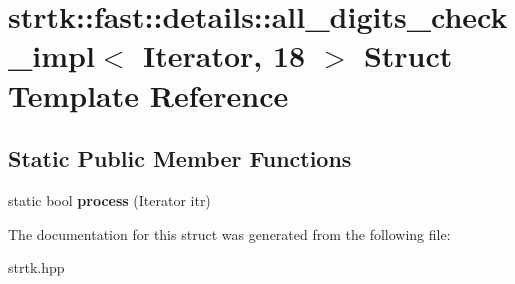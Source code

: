 \hypertarget{structstrtk_1_1fast_1_1details_1_1all__digits__check__impl_3_01Iterator_00_0118_01_4}{\section{strtk\-:\-:fast\-:\-:details\-:\-:all\-\_\-digits\-\_\-check\-\_\-impl$<$ Iterator, 18 $>$ Struct Template Reference}
\label{structstrtk_1_1fast_1_1details_1_1all__digits__check__impl_3_01Iterator_00_0118_01_4}
}
\subsection*{Static Public Member Functions}
\begin{DoxyCompactItemize}
\item 
\hypertarget{structstrtk_1_1fast_1_1details_1_1all__digits__check__impl_3_01Iterator_00_0118_01_4_aeb7812faea601b05ef7bfc5637e872d1}{static bool {\bfseries process} (Iterator itr)}\label{structstrtk_1_1fast_1_1details_1_1all__digits__check__impl_3_01Iterator_00_0118_01_4_aeb7812faea601b05ef7bfc5637e872d1}

\end{DoxyCompactItemize}


The documentation for this struct was generated from the following file\-:\begin{DoxyCompactItemize}
\item 
strtk.\-hpp\end{DoxyCompactItemize}
